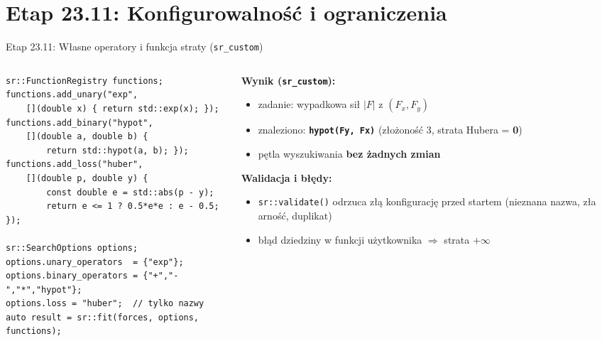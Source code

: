 \documentclass[
  polish,
  aspectratio=169,
]{beamer}
\begin{document}
\section{Etap 23.11: Konfigurowalność i ograniczenia}
\begin{frame}[fragile]{Etap 23.11: Własne operatory i funkcja straty (\texttt{sr\_custom})}
  \begin{columns}[c]
    \begin{column}{0.56\textwidth}
\begin{lstlisting}
sr::FunctionRegistry functions;
functions.add_unary("exp",
    [](double x) { return std::exp(x); });
functions.add_binary("hypot",
    [](double a, double b) {
        return std::hypot(a, b); });
functions.add_loss("huber",
    [](double p, double y) {
        const double e = std::abs(p - y);
        return e <= 1 ? 0.5*e*e : e - 0.5; });

sr::SearchOptions options;
options.unary_operators  = {"exp"};
options.binary_operators = {"+","-","*","hypot"};
options.loss = "huber";  // tylko nazwy
auto result = sr::fit(forces, options, functions);
\end{lstlisting}
    \end{column}
    \begin{column}{0.41\textwidth}
      \textbf{Wynik (\texttt{sr\_custom}):}
      \begin{itemize}\footnotesize
        \item zadanie: wypadkowa sił $|F|$ z $(F_x, F_y)$
        \item znaleziono: \textcolor{aghgreen}{\textbf{\texttt{hypot(Fy, Fx)}}} (złożoność 3, strata Hubera = \textbf{0})
        \item pętla wyszukiwania \textbf{bez żadnych zmian}
      \end{itemize}
      \smallskip
      \textbf{Walidacja i błędy:}
      \begin{itemize}\footnotesize
        \item \texttt{sr::validate()} odrzuca złą konfigurację przed startem (nieznana nazwa, zła arność, duplikat)
        \item błąd dziedziny w funkcji użytkownika $\Rightarrow$ strata $+\infty$
      \end{itemize}
    \end{column}
  \end{columns}
\end{frame}
\end{document}
